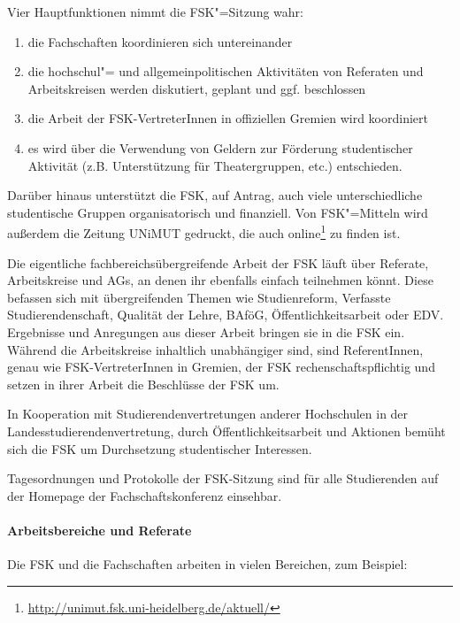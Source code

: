 Vier Hauptfunktionen nimmt die \gls{FSK}"=Sitzung wahr:
\begin{enumerate}
\item die Fachschaften koordinieren sich untereinander
\item die hochschul"= und allgemeinpolitischen Aktivitäten von Referaten und Arbeitskreisen werden diskutiert, geplant und ggf. beschlossen
\item die Arbeit der \gls{FSK}-VertreterInnen in offiziellen Gremien wird koordiniert
\item es wird über die Verwendung von Geldern zur Förderung studentischer Aktivität (z.B. Unterstützung für Theatergruppen, etc.) entschieden.
\end{enumerate}

Darüber hinaus unterstützt die \gls{FSK}, auf Antrag, auch viele unterschiedliche studentische Gruppen organisatorisch und finanziell. Von \gls{FSK}"=Mitteln wird außerdem die Zeitung UNiMUT gedruckt, die auch online\footnote{\url{http://unimut.fsk.uni-heidelberg.de/aktuell/}} zu finden ist.

Die eigentliche fachbereichsübergreifende Arbeit der \gls{FSK} läuft über Referate, Arbeitskreise und AGs, an denen ihr ebenfalls einfach teilnehmen könnt. Diese befassen sich mit übergreifenden Themen wie Studienreform, Verfasste Studierendenschaft, Qualität der Lehre, BAföG, Öffentlichkeitsarbeit oder EDV. Ergebnisse und Anregungen aus dieser Arbeit bringen sie in die \gls{FSK} ein. Während die Arbeitskreise inhaltlich unabhängiger sind, sind ReferentInnen, genau wie \gls{FSK}-VertreterInnen in Gremien, der \gls{FSK} rechenschaftspflichtig und setzen in ihrer Arbeit die Beschlüsse der \gls{FSK} um.

In Kooperation mit Studierendenvertretungen anderer Hochschulen in der Landesstudierendenvertretung, durch Öffentlichkeitsarbeit und Aktionen bemüht sich die \gls{FSK} um Durchsetzung studentischer Interessen.

Tagesordnungen und Protokolle der \gls{FSK}-Sitzung sind für alle Studierenden auf der Homepage der Fachschaftskonferenz einsehbar.

\paragraph{Arbeitsbereiche und Referate}

Die \gls{FSK} und die Fachschaften arbeiten in vielen Bereichen, zum Beispiel:

